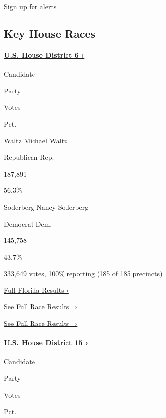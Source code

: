 \protect\hyperlink{}{Sign up for alerts}

\hypertarget{key-house-races}{%
\subsection{Key House Races}\label{key-house-races}}

\hypertarget{us-house-district-6-}{%
\paragraph{\texorpdfstring{\href{https://www.nytimes3xbfgragh.onion/elections/results/florida-house-district-6}{U.S.
House District 6
›}}{U.S. House District 6 ›}}\label{us-house-district-6-}}

Candidate

Party

Votes

Pct.

 Waltz Michael Waltz

Republican Rep.

187,891

56.3\%

 Soderberg Nancy Soderberg

Democrat Dem.

145,758

43.7\%

333,649 votes, 100\% reporting (185 of 185 precincts)

\href{https://www.nytimes3xbfgragh.onion/interactive/2018/11/06/us/elections/results-florida-elections.html}{Full
Florida Results ›}

\href{https://www.nytimes3xbfgragh.onion/elections/results/florida-house-district-6}{See
Full Race Results~ ›}

\href{https://www.nytimes3xbfgragh.onion/elections/results/florida-house-district-6}{See
Full Race Results~ ›}

\hypertarget{us-house-district-15-}{%
\paragraph{\texorpdfstring{\href{https://www.nytimes3xbfgragh.onion/elections/results/florida-house-district-15}{U.S.
House District 15
›}}{U.S. House District 15 ›}}\label{us-house-district-15-}}

Candidate

Party

Votes

Pct.

